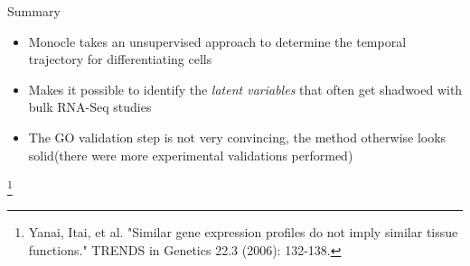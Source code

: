 \documentclass[10pt]{beamer}
\newcommand\blfootnote[1]{%
	\begingroup
	\renewcommand\thefootnote{}\footnote{#1}%
	\addtocounter{footnote}{-1}%
	\endgroup
}
\begin{document}
\begin{frame}{Summary}

\begin{itemize}
	\item Monocle takes an unsupervised approach to determine the temporal trajectory for differentiating cells
	\item Makes it possible to identify the \emph{latent variables} that often get shadwoed with bulk RNA-Seq studies
	\item The GO validation step is not very convincing, the method otherwise looks solid(there were more experimental validations performed)
\end{itemize}
 
 \blfootnote{Yanai, Itai, et al. "Similar gene expression profiles do not imply similar tissue functions." TRENDS in Genetics 22.3 (2006): 132-138.}

\end{frame}

\end{document}
